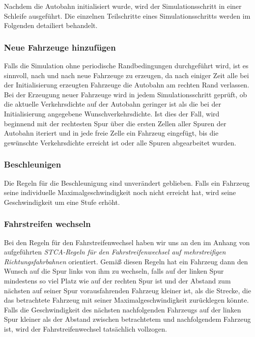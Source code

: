 \documentclass[11pt, a4paper]{article}
\newcommand\q[1]{\glqq{}#1\grqq{}}
\begin{document}
Nachdem die Autobahn initialisiert wurde, wird der Simulationsschritt in einer Schleife ausgeführt. Die einzelnen Teilschritte eines Simulationsschritts werden im Folgenden detailiert behandelt.


\subsubsection{Neue Fahrzeuge hinzufügen}
\label{subsubsec:neueFahrzeuge}

Falls die Simulation ohne periodische Randbedingungen durchgeführt wird, ist es sinnvoll, nach und nach neue Fahrzeuge zu erzeugen, da nach einiger Zeit alle bei der Initialisierung erzeugten Fahrzeuge die Autobahn am rechten Rand verlassen. Bei der Erzeugung neuer Fahrzeuge wird in jedem Simulationsschritt geprüft, ob die aktuelle Verkehrsdichte auf der Autobahn geringer ist als die bei der Initialisierung angegebene Wunschverkehrsdichte. Ist dies der Fall, wird beginnend mit der rechtesten Spur über die ersten Zellen aller Spuren der Autobahn iteriert und in jede freie Zelle ein Fahrzeug eingefügt, bis die gewünschte Verkehrsdichte erreicht ist oder alle Spuren abgearbeitet wurden. 

\subsubsection{Beschleunigen}
\label{subsubsec:beschleunigen}

Die Regeln für die Beschleunigung sind unverändert geblieben. Falls ein Fahrzeug seine individuelle Maximalgeschwindigkeit noch nicht erreicht hat, wird seine Geschwindigkeit um eine Stufe erhöht.

\subsubsection{Fahrstreifen wechseln}
\label{subsubsec:fahrstreifenWechseln}

Bei den Regeln für den Fahrstreifenwechsel haben wir uns an den im Anhang von \cite{mehrspurig} aufgeführten \emph{\q{STCA-Regeln für den Fahrstreifenwechsel auf mehrstreifigen Richtungsfahrbahnen}} orientiert. Gemäß diesen Regeln hat ein Fahrzeug dann den Wunsch auf die Spur links von ihm zu wechseln, falls auf der linken Spur mindestens so viel Platz wie auf der rechten Spur ist und der Abstand zum nächsten auf seiner Spur vorausfahrenden Fahrzeug kleiner ist, als die Strecke, die das betrachtete Fahrzeug mit seiner Maximalgeschwindigkeit zurücklegen könnte. Falls die Geschwindigkeit des nächsten nachfolgenden Fahrzeugs auf der linken Spur kleiner als der Abstand zwischen betrachtetem und nachfolgendem Fahrzeug ist, wird der Fahrstreifenwechsel tatsächlich vollzogen.
\end{document}
